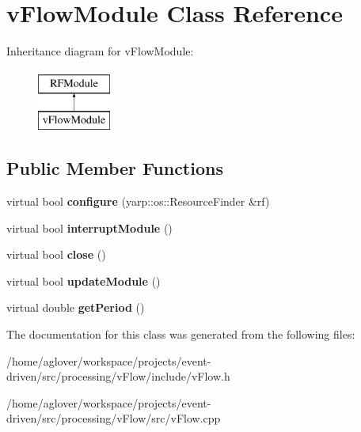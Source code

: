 \hypertarget{classvFlowModule}{}\section{v\+Flow\+Module Class Reference}
\label{classvFlowModule}
Inheritance diagram for v\+Flow\+Module\+:\begin{figure}[H]
\begin{center}
\leavevmode
\includegraphics[height=2.000000cm]{classvFlowModule}
\end{center}
\end{figure}
\subsection*{Public Member Functions}
\begin{DoxyCompactItemize}
\item 
virtual bool {\bfseries configure} (yarp\+::os\+::\+Resource\+Finder \&rf)\hypertarget{classvFlowModule_a5cf91bc0de9e311b1946c6ec044fd947}{}\label{classvFlowModule_a5cf91bc0de9e311b1946c6ec044fd947}

\item 
virtual bool {\bfseries interrupt\+Module} ()\hypertarget{classvFlowModule_a49a90a2d595d99bf290423dd930eefe2}{}\label{classvFlowModule_a49a90a2d595d99bf290423dd930eefe2}

\item 
virtual bool {\bfseries close} ()\hypertarget{classvFlowModule_a63a3da2ac7ba9631753ea244d8bc4358}{}\label{classvFlowModule_a63a3da2ac7ba9631753ea244d8bc4358}

\item 
virtual bool {\bfseries update\+Module} ()\hypertarget{classvFlowModule_a880de21f5c85d684f7c0999d0a84e26b}{}\label{classvFlowModule_a880de21f5c85d684f7c0999d0a84e26b}

\item 
virtual double {\bfseries get\+Period} ()\hypertarget{classvFlowModule_a8f6f74c4a7888e162c2dff8a34a84323}{}\label{classvFlowModule_a8f6f74c4a7888e162c2dff8a34a84323}

\end{DoxyCompactItemize}


The documentation for this class was generated from the following files\+:\begin{DoxyCompactItemize}
\item 
/home/aglover/workspace/projects/event-\/driven/src/processing/v\+Flow/include/v\+Flow.\+h\item 
/home/aglover/workspace/projects/event-\/driven/src/processing/v\+Flow/src/v\+Flow.\+cpp\end{DoxyCompactItemize}
